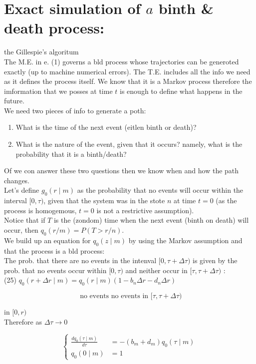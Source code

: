 \documentclass[10pt]{article}
\begin{document}
\section*{Exact simulation of $a$ binth \& death process:}
the Gillespie's algoritum\\
The M.E. in e. (1) governs a bld process whose trajectories can be generoted exactly (up to machine numerical errors). The T.E. includes all the info we need as it defines the process itself. We know that it is a Markov process therefore the imformation that we posses at time $t$ is enough to define what happens in the future.\\
We need two pieces of info to generate a poth:

\begin{enumerate}
  \item What is the time of the next event (eitlen binth or death)?
  \item What is the nature of the event, given that it occurs? namely, what is the probability that it is a binth/death?
\end{enumerate}

Of we con answer these two questions then we know when and how the path changes.\\
Let's define $g_{0}(r \mid m)$ as the probability that no events will occur within the interval $[0, \tau)$, given that the system was in the stote $n$ at time $t=0$ (as the process is homogemous, $t=0$ is not a restrictive assumption).\\
Notice that if $T$ is the (zondom) time when the next event (binth on death) will occur, then $q_{0}(r / m)=P(T>r / n)$.\\
We build up an equation for $q_{0}(z \mid m)$ by using the Markov assumption and that the process is a bld process:\\
The prob. that there are no events in the intenval $[0, \tau+\Delta \tau)$ is given by the prob. that no events occur within $[0, \tau)$ and neither occur in $[\tau, \tau+\Delta \tau)$ :\\
(25) $q_{0}(r+\Delta r \mid m)=q_{0}(r \mid m)\left(1-b_{n} \Delta r-d_{n} \Delta r\right)$

$$
\text { no events no events in }[\tau, \tau+\Delta \tau)
$$

in $[0, r)$\\
Therefore as $\Delta \tau \rightarrow 0$

$$
\left\{\begin{aligned}
\frac{d q_{0}(\tau \mid m)}{d \tau} & =-\left(b_{m}+d_{m}\right) q_{0}(\tau \mid m) \\
q_{0}(0 \mid m) & =1
\end{aligned}\right.
$$
\end{document}
